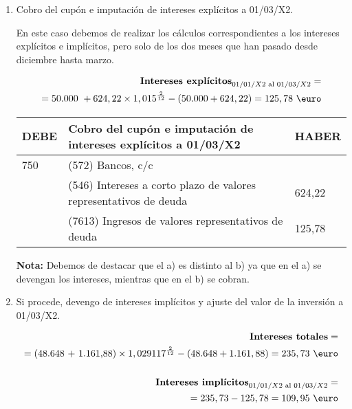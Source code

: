 \begin{enumerate}[label=\alph*)]
    \item Cobro del cupón e imputación de intereses explícitos a 01/03/X2.
    
    En este caso debemos de realizar los cálculos correspondientes a los intereses explícitos e implícitos, pero solo de los dos meses que han pasado desde diciembre hasta marzo.

    \begin{align*}
        \text{\textbf{Intereses explícitos}}_{01/01/X2 \text{ al } 01/03/X2}  = \\ 
        = \text{50.000 }+ 624,22 \times 1,015^{\frac{2}{12}} - (50.000 + 624,22) = 125,78 \text{ \euro} \\
    \end{align*}

    \begin{table}[H]
        \centering
        \begin{tabular}{|p{3cm}|p{6cm}|p{3cm}|}
        \hline
        \rowcolor{blue!30}
        \textbf{DEBE} & \textbf{Cobro del cupón e imputación de intereses explícitos a 01/03/X2} & \textbf{HABER} \\
        \hline
        750 & (572) Bancos, c/c & \\
        \hline
        & (546) Intereses a corto plazo de valores representativos de deuda & 624,22 \\
        \hline
        & (7613) Ingresos de valores representativos de deuda & 125,78 \\
        \hline
        \end{tabular}
    \end{table}

    \begin{tcolorbox}[colback=red!5!white,colframe=red!75!black]
        \textbf{Nota:} Debemos de destacar que el a) es distinto al b) ya que en el a) se devengan los intereses, mientras que en el b) se cobran.
        
    \end{tcolorbox}


    \item Si procede, devengo de intereses implícitos y ajuste del valor de la inversión a 01/03/X2.
    
    \begin{align*}
        \text{\textbf{Intereses totales}} = \\ 
        = \text{(48.648 + 1.161,88)} \times 1,029117^{\frac{2}{12}} - (48.648 + 1.161,88) = 235,73 \text{ \euro} \\\\
        \text{\textbf{Intereses implícitos}}_{01/01/X2 \text{ al } 01/03/X2} = \\ = 235,73 - 125,78 = 109,95 \text{ \euro}
    \end{align*}


\end{enumerate}
